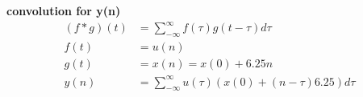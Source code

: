 \documentclass[journal,12pt,twocolumn]{IEEEtran}
\theoremstyle{remark}
\begin{document}
\textbf{{convolution for y(n)}}
\begin{align}
(f*g)(t)&=\sum_{-\infty}^{\infty}{f({\tau})g(t-{\tau})d\tau}
\\f(t)&=u(n)
\\g(t)&=x(n)=x(0)+6.25n
\\y(n)&=\sum_{-\infty}^{\infty}{u({\tau})(x(0)+(n-\tau)6.25)d\tau}
\end{align}
 
\end{document}
